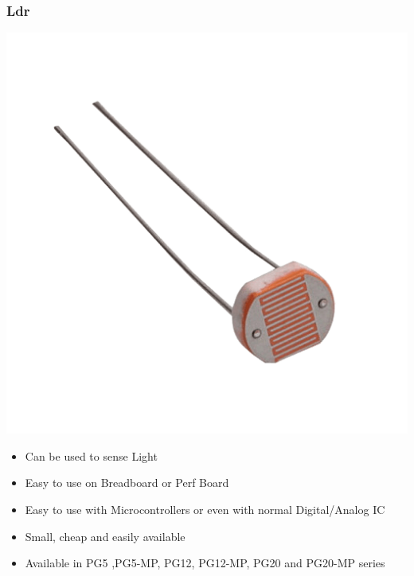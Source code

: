 \documentclass[12pt,a4paper,portrait]{article}
\begin{document}
			\subsubsection{Ldr}
				\begin{center}
					\includegraphics[scale=0.3]{./img/ldr.png}
				\end{center}
			\begin{itemize}
				\item Can be used to sense Light
				\item Easy to use on Breadboard or Perf Board
				\item Easy to use with Microcontrollers or even with normal Digital/Analog IC
				\item Small, cheap and easily available
				\item Available in PG5 ,PG5-MP, PG12, PG12-MP, PG20 and PG20-MP series
			\end{itemize}
\end{document}

